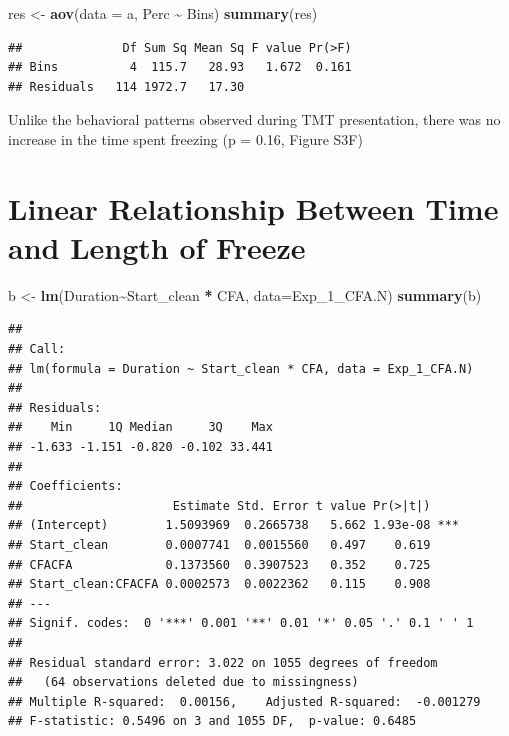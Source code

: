 \documentclass[
]{book}
\newenvironment{Shaded}{\begin{snugshade}}{\end{snugshade}}
\newcommand{\AttributeTok}[1]{\textcolor[rgb]{0.13,0.29,0.53}{#1}}
\newcommand{\FunctionTok}[1]{\textcolor[rgb]{0.13,0.29,0.53}{\textbf{#1}}}
\newcommand{\NormalTok}[1]{#1}
\newcommand{\OtherTok}[1]{\textcolor[rgb]{0.56,0.35,0.01}{#1}}
\newcommand{\SpecialCharTok}[1]{\textcolor[rgb]{0.81,0.36,0.00}{\textbf{#1}}}
\begin{document}
\begin{Shaded}
\begin{Highlighting}[]
\NormalTok{res }\OtherTok{\textless{}{-}} \FunctionTok{aov}\NormalTok{(}\AttributeTok{data =}\NormalTok{ a, Perc }\SpecialCharTok{\textasciitilde{}}\NormalTok{ Bins)}
\FunctionTok{summary}\NormalTok{(res)}
\end{Highlighting}
\end{Shaded}

\begin{verbatim}
##              Df Sum Sq Mean Sq F value Pr(>F)
## Bins          4  115.7   28.93   1.672  0.161
## Residuals   114 1972.7   17.30
\end{verbatim}

Unlike the behavioral patterns observed during TMT presentation, there was no increase in the time spent freezing (p = 0.16, Figure S3F)

\section*{Linear Relationship Between Time and Length of Freeze}\label{linear-relationship-between-time-and-length-of-freeze-1}

\begin{Shaded}
\begin{Highlighting}[]
\NormalTok{b }\OtherTok{\textless{}{-}} \FunctionTok{lm}\NormalTok{(Duration}\SpecialCharTok{\textasciitilde{}}\NormalTok{Start\_clean }\SpecialCharTok{*}\NormalTok{ CFA, }\AttributeTok{data=}\NormalTok{Exp\_1\_CFA.N)}
\FunctionTok{summary}\NormalTok{(b)}
\end{Highlighting}
\end{Shaded}

\begin{verbatim}
## 
## Call:
## lm(formula = Duration ~ Start_clean * CFA, data = Exp_1_CFA.N)
## 
## Residuals:
##    Min     1Q Median     3Q    Max 
## -1.633 -1.151 -0.820 -0.102 33.441 
## 
## Coefficients:
##                     Estimate Std. Error t value Pr(>|t|)    
## (Intercept)        1.5093969  0.2665738   5.662 1.93e-08 ***
## Start_clean        0.0007741  0.0015560   0.497    0.619    
## CFACFA             0.1373560  0.3907523   0.352    0.725    
## Start_clean:CFACFA 0.0002573  0.0022362   0.115    0.908    
## ---
## Signif. codes:  0 '***' 0.001 '**' 0.01 '*' 0.05 '.' 0.1 ' ' 1
## 
## Residual standard error: 3.022 on 1055 degrees of freedom
##   (64 observations deleted due to missingness)
## Multiple R-squared:  0.00156,    Adjusted R-squared:  -0.001279 
## F-statistic: 0.5496 on 3 and 1055 DF,  p-value: 0.6485
\end{verbatim}
\end{document}
